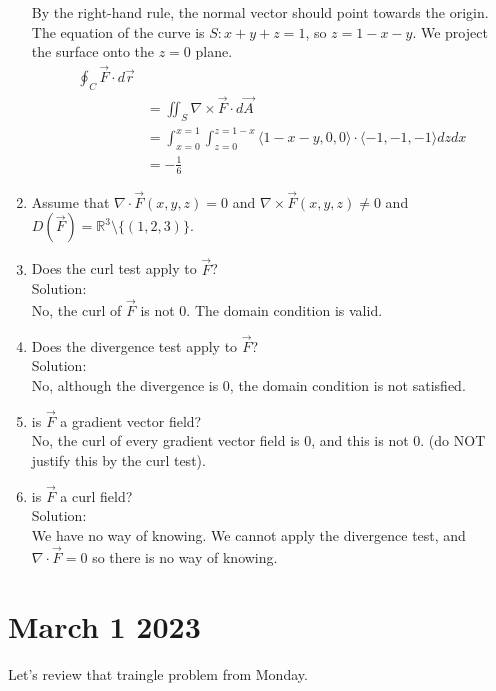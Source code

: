 \documentclass[11pt]{article}
\begin{document}
\begin{enumerate}
              By the right-hand rule, the normal vector should point towards the origin. The equation of the curve is $S: x + y + z  = 1 $, so $z = 1- x - y$.
              We project the surface onto the $z=0$ plane.
              \begin{align*}
                \oint_{C} \vec{F} \cdot d\vec{r} \\
                &= \iint_{S} \nabla \times \vec{F} \cdot d\vec{A} \\
                &= \int_{x = 0}^{x=1}\int_{z  =0}^{z=1-x} \langle 1-x-y, 0, 0 \rangle \cdot \langle -1, -1, -1 \rangle dz dx \\
                &= - \frac{1}{6}
                \end{align*}
        \item Assume that $\nabla \cdot \vec{F}(x,y,z) = 0$ and $\nabla \times \vec{F}(x,y,z) \neq 0$ and $D(\vec{F}) = \mathbb{R}^{3} \setminus \{(1,2,3)\}$.
        \item Does the curl test apply to $\vec{F}$? \\
              Solution: \\
              No, the curl of $\vec{F}$ is not 0. The domain condition is valid.
        \item Does the divergence test apply to $\vec{F}$? \\
              Solution: \\
              No, although the divergence is $0$, the domain condition is not satisfied.
        \item is $\vec{F}$ a gradient vector field?\\
              No, the curl of every gradient vector field is $0$, and this is not $0$. (do NOT justify this by the curl test).
        \item is $\vec{F}$ a curl field?\\
              Solution: \\
              We have no way of knowing. We cannot apply the divergence test, and $\nabla \cdot \vec{F} =0$ so there is no way of knowing.
              \end{enumerate}
      \section{March 1 2023}
      Let's review that traingle problem from Monday.
\end{document}
